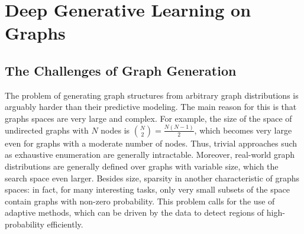 \chapter{Deep Generative Learning on Graphs} %
\label{ch:deep-generative-learning-graphs}

\section{The Challenges of Graph Generation}
The problem of generating graph structures from arbitrary graph distributions is arguably harder than their predictive modeling. The main reason for this is that graphs spaces are very large and complex. For example, the size of the space of undirected graphs with $N$ nodes is ${N \choose 2} = \frac{N(N-1)}{2}$, which becomes very large even for graphs with a moderate number of nodes. Thus, trivial approaches such as exhaustive enumeration are generally intractable. Moreover, real-world graph distributions are generally defined over graphs with variable size, which the search space even larger. Besides size, sparsity in another characteristic of graphs spaces: in fact, for many interesting tasks, only very small subsets of the space contain graphs with non-zero probability. This problem calls for the use of adaptive methods, which can be driven by the data to detect regions of high-probability efficiently.

